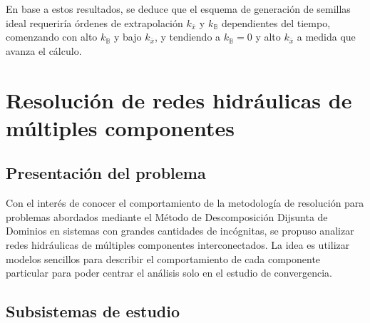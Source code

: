 En base a estos resultados, se deduce que el esquema de generación de semillas ideal
requeriría órdenes de extrapolación $k_{\bar{x}}$ y $k_{\mathbb{B}}$ dependientes del tiempo,
comenzando con alto $k_{\mathbb{B}}$ y bajo $k_{\bar{x}}$, y tendiendo a $k_{\mathbb{B}}=0$ y alto $k_{\bar{x}}$ a medida que avanza el cálculo.

\section{Resolución de redes hidráulicas de múltiples componentes}
\label{3:redes}

\subsection*{Presentación del problema}
\label{3:redes-presentacion}

Con el interés de conocer el comportamiento de la metodología de resolución
para problemas abordados mediante el Método de Descomposición Dijsunta de Dominios en sistemas con grandes cantidades de incógnitas,
se propuso analizar redes hidráulicas de múltiples componentes interconectados.
La idea es utilizar modelos sencillos para describir el comportamiento de cada componente particular para poder centrar el análisis solo en el estudio de convergencia.

\subsection*{Subsistemas de estudio}
\label{3:redes-subsistemas}

